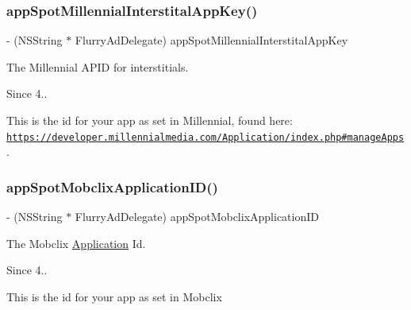 \subsubsection{\texorpdfstring{app\+Spot\+Millennial\+Interstital\+App\+Key()}{appSpotMillennialInterstitalAppKey()}}
{\footnotesize\ttfamily -\/ (N\+S\+String $\ast$ Flurry\+Ad\+Delegate) app\+Spot\+Millennial\+Interstital\+App\+Key \begin{DoxyParamCaption}{ }\end{DoxyParamCaption}}



The Millennial A\+P\+ID for interstitials. 

\begin{DoxySince}{Since}
4..
\end{DoxySince}
This is the id for your app as set in Millennial, found here\+: \href{https://developer.millennialmedia.com/Application/index.php#manageApps}{\tt https\+://developer.\+millennialmedia.\+com/\+Application/index.\+php\#manage\+Apps}. \mbox{\label{protocolFlurryAdDelegate_01-p_af91d5c9908f99a56139a9efaa052defc}} 
\subsubsection{\texorpdfstring{app\+Spot\+Mobclix\+Application\+I\+D()}{appSpotMobclixApplicationID()}}
{\footnotesize\ttfamily -\/ (N\+S\+String $\ast$ Flurry\+Ad\+Delegate) app\+Spot\+Mobclix\+Application\+ID \begin{DoxyParamCaption}{ }\end{DoxyParamCaption}}



The Mobclix \hyperlink{classApplication}{Application} Id. 

\begin{DoxySince}{Since}
4..
\end{DoxySince}
This is the id for your app as set in Mobclix \mbox{\label{protocolFlurryAdDelegate_01-p_a5094ad1ca096d70d75b05a5ab4a9a9a5}} 
